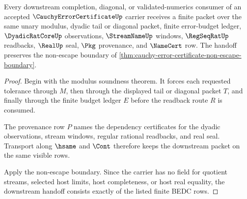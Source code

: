 \begin{theorem}
\label{thm:cauchy-error-certificate-downstream-handoff}
Every downstream completion, diagonal, or validated-numerics consumer of an accepted $\CauchyErrorCertificateUp$ carrier receives a finite packet over the same unary modulus, dyadic tail or diagonal packet, finite error-budget ledger, $\DyadicRatCoreUp$ observations, $\StreamNameUp$ windows, $\RegSeqRatUp$ readbacks, $\RealUp$ seal, $\Pkg$ provenance, and $\NameCert$ row. The handoff preserves the non-escape boundary of \autoref{thm:cauchy-error-certificate-non-escape-boundary}.
\end{theorem}
\begin{proof}
Begin with the modulus soundness theorem. It forces each requested tolerance through $M$, then through the displayed tail or diagonal packet $T$, and finally through the finite budget ledger $E$ before the readback route $R$ is consumed.

The provenance row $P$ names the dependency certificates for the dyadic observations, stream windows, regular rational readbacks, and real seal. Transport along $\hsame$ and $\Cont$ therefore keeps the downstream packet on the same visible rows.

Apply the non-escape boundary. Since the carrier has no field for quotient streams, selected host limits, host completeness, or host real equality, the downstream handoff consists exactly of the listed finite BEDC rows.
\end{proof}

